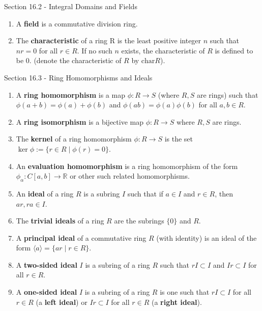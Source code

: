 \documentclass[12pt]{article}
\theoremstyle{definition}
\theoremstyle{named}
\begin{document}
\begin{section}{Section 16.2 - Integral Domains and Fields}
    \begin{enumerate}
        \item A \textbf{field} is a commutative division ring. 
        \item The \textbf{characteristic} of a ring R is the least positive integer $n$ such that $nr=0$ for all $r \in R$. If no such $n$ exists, the characteristic of $R$ is defined to be 0. (denote the characteristic of $R$ by $\textrm{char} R$). 
    \end{enumerate}
\end{section}

\begin{section}{Section 16.3 - Ring Homomorphisms and Ideals}
    \begin{enumerate}
        \item A \textbf{ring homomorphism} is a map $\phi: R \to S$ (where $R,S$ are rings) such that $\phi(a+b) = \phi(a) + \phi(b)$ and $\phi(ab) = \phi(a)\phi(b)$ for all $a,b \in R$. 
        \item A \textbf{ring isomorphism} is a bijective map $\phi: R \to S$ where $R,S$ are rings. 
        \item The \textbf{kernel} of a ring homomorphism $\phi: R \to S$ is the set $\ker\phi := \{r \in R \mid \phi(r) = 0\}$. 
        \item An \textbf{evaluation homomorphism} is a ring homomorphism of the form $\phi_\alpha: C[a,b] \to \mathbb{R}$ or other such related homomorphisms. 
        \item An \textbf{ideal} of a ring $R$ is a subring $I$ such that if $a \in I$ and $r \in R$, then $ar,ra \in I$. 
        \item The \textbf{trivial ideals} of a ring $R$ are the subrings $\{0\}$ and $R$. 
        \item A \textbf{principal ideal} of a commutative ring $R$ (with identity) is an ideal of the form $\langle a \rangle = \{ar \mid r \in R\}$. 
        \item A \textbf{two-sided ideal} $I$ is a subring of a ring $R$ such that $rI \subset I$ and $Ir \subset I$ for all $r \in R$. 
        \item A \textbf{one-sided ideal} $I$ is a subring of a ring $R$ is one such that $rI \subset I$ for all $r \in R$ (a \textbf{left ideal}) or $Ir \subset I$ for all $r \in R$ (a \textbf{right ideal}). 
    \end{enumerate}
\end{section}
\end{document}
